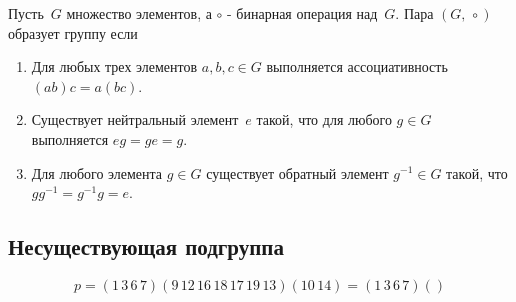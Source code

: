 \documentclass{tufte-book}
\begin{document}
Пусть~$G$ множество элементов, а $\circ$ - бинарная операция над~$G$. Пара $(G,\,
\circ)$ образует группу если

\begin{enumerate}
    \item Для любых трех элементов $a,b,c \in G$ выполняется ассоциативность $(ab)c = a(bc)$.
    \item Существует нейтральный элемент~$e$ такой, что для любого $g \in G$ выполняется $eg = ge = g$.
    \item Для любого элемента $g \in G$ существует обратный элемент $g^{-1} \in G$ такой, что $gg^{-1} = g^{-1}g = e$.
\end{enumerate}

\subsection{Несуществующая подгруппа}
$$ p = (1\,3\,6\,7) (9\,12\,16\,18\,17\,19\,13) (10\,14)
= (1\,3\,6\,7) ()
$$
\end{document}
